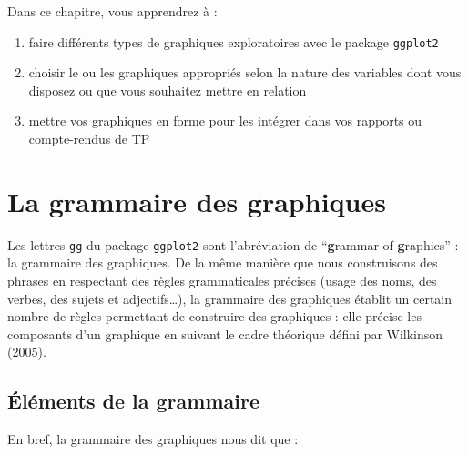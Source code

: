 \documentclass[
  a4paper,
  DIV=11,
  numbers=noendperiod,
  oneside]{scrreprt}
\providecommand{\tightlist}{%
  \setlength{\itemsep}{0pt}\setlength{\parskip}{0pt}}\usepackage{longtable,booktabs,array}
\begin{document}
\begin{tcolorbox}[enhanced jigsaw, coltitle=black, toprule=.15mm, opacityback=0, breakable, colback=white, opacitybacktitle=0.6, colframe=quarto-callout-tip-color-frame, leftrule=.75mm, rightrule=.15mm, titlerule=0mm, bottomtitle=1mm, toptitle=1mm, arc=.35mm, title=\textcolor{quarto-callout-tip-color}{\faLightbulb}\hspace{0.5em}{Objectifs}, colbacktitle=quarto-callout-tip-color!10!white, bottomrule=.15mm, left=2mm]

Dans ce chapitre, vous apprendrez à :

\begin{enumerate}
\def\labelenumi{\arabic{enumi}.}
\tightlist
\item
  faire différents types de graphiques exploratoires avec le package
  \texttt{ggplot2}  
\item
  choisir le ou les graphiques appropriés selon la nature des variables
  dont vous disposez ou que vous souhaitez mettre en relation
\item
  mettre vos graphiques en forme pour les intégrer dans vos rapports ou
  compte-rendus de TP
\end{enumerate}

\end{tcolorbox}

\section{La grammaire des graphiques}\label{sec-gggraph}

Les lettres \texttt{gg} du package \texttt{ggplot2} sont l'abréviation
de ``\textbf{g}rammar of \textbf{g}raphics'' : la grammaire des
graphiques. De la même manière que nous construisons des phrases en
respectant des règles grammaticales précises (usage des noms, des
verbes, des sujets et adjectifs\ldots), la grammaire des graphiques
établit un certain nombre de règles permettant de construire des
graphiques : elle précise les composants d'un graphique en suivant le
cadre théorique défini par Wilkinson (2005).

\subsection{Éléments de la
grammaire}\label{uxe9luxe9ments-de-la-grammaire}

En bref, la grammaire des graphiques nous dit que :
\end{document}
